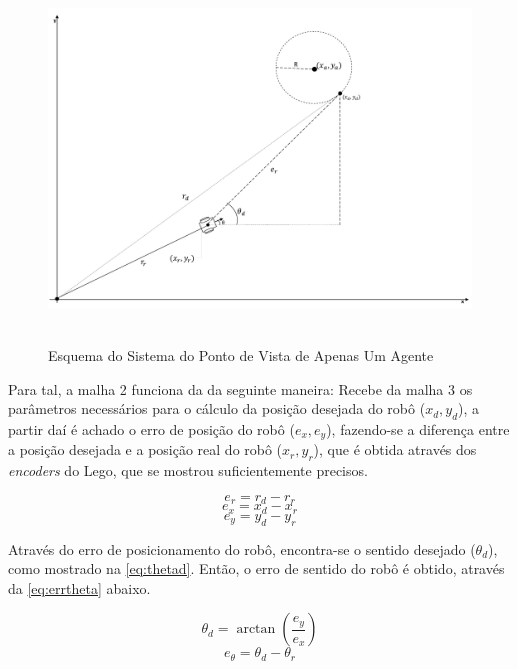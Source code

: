 \begin{figure}[!htb]
	\centering
	\caption{Esquema do Sistema do Ponto de Vista de Apenas Um Agente}
	\includegraphics[width=1.0\textwidth]{./04-figuras/esqSistema}
	\
	\label{fig:esq2}
\end{figure}

Para tal, a malha 2 funciona da da seguinte maneira: Recebe da malha 3 os parâmetros necessários para o cálculo da posição desejada do robô (\emph{$x_{d},y_{d}$}), a partir daí é achado o erro de posição do robô (\emph{$e_{x},e_{y}$}), fazendo-se a diferença entre a posição desejada e a posição real do robô (\emph{$x_{r},y_{r}$}), que é obtida através dos \emph{encoders} do Lego, que se mostrou suficientemente precisos.

\begin{equation}
e_{r} = r_{d} - r_{r}
\label{eq:errr}
\end{equation}
\begin{equation}
e_{x} = x_{d} - x_{r}
\label{eq:errx}
\end{equation}
\begin{equation}
e_{y} = y_{d} - y_{r}
\label{eq:erry}
\end{equation}

Através do erro de posicionamento do robô, encontra-se o sentido desejado (\emph{$\theta_{d}$}), como mostrado na \autoref{eq:thetad}. Então, o erro de sentido do robô é obtido, através da \autoref{eq:errtheta} abaixo. 

\begin{equation}
\theta_{d} = \arctan(\dfrac{e_{y}}{e_{x}})
\label{eq:thetad}
\end{equation}
\begin{equation}
e_{\theta} = \theta_{d} - \theta_{r}
\label{eq:errtheta}
\end{equation}


